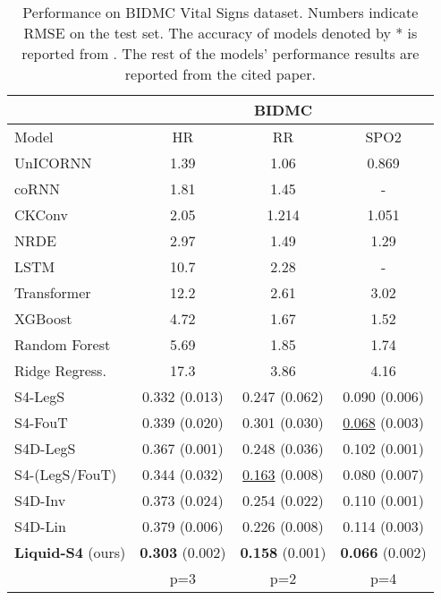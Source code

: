 \documentclass{MITcsail}
\begin{document}
\begin{table}[t]
    \centering
    \caption{Performance on BIDMC Vital Signs dataset. Numbers indicate RMSE on the test set. The accuracy of models denoted by * is reported from \citep{gu2022parameterization}. The rest of the models' performance results are reported from the cited paper.}
    \begin{adjustbox}{width=0.65\columnwidth}
    \begin{tabular}{lccc}
    \toprule
     & &  \textbf{BIDMC} & \\
     \toprule
        Model & HR & RR & SPO2 \\
        \midrule
UnICORNN \citep{rusch2021coupled} & 1.39 & 1.06 & 0.869 \\
coRNN \citep{rusch2021coupled} & 1.81 & 1.45 & - \\
CKConv & 2.05 & 1.214 & 1.051 \\
NRDE \citep{morrill2021neural} & 2.97 & 1.49 & 1.29 \\
LSTM & 10.7 & 2.28 & - \\
Transformer & 12.2 & 2.61 & 3.02 \\
XGBoost \citep{tan2021time} & 4.72 & 1.67 & 1.52 \\
Random Forest \citep{tan2021time} & 5.69 & 1.85 & 1.74 \\
Ridge Regress. \citep{tan2021time} &  17.3 & 3.86 & 4.16 \\
\midrule
        S4-LegS \citep{gu2022parameterization} & 0.332 (0.013) & 0.247 (0.062) & 0.090 (0.006) \\ 
        S4-FouT \citep{gu2022parameterization} & 0.339 (0.020) & 0.301 (0.030) & \underline {0.068} (0.003) \\ 
        S4D-LegS \citep{gu2022parameterization} & 0.367 (0.001) & 0.248 (0.036) & 0.102 (0.001) \\ 
        S4-(LegS/FouT) \citep{gu2022parameterization} & 0.344 (0.032) & \underline{0.163} (0.008) & 0.080 (0.007) \\
        S4D-Inv \citep{gu2022parameterization} & 0.373 (0.024) & 0.254 (0.022) & 0.110 (0.001) \\ 
        S4D-Lin \citep{gu2022parameterization} & 0.379 (0.006) & 0.226 (0.008) & 0.114 (0.003) \\ 
        \midrule
        \textbf{Liquid-S4} (ours) & \textbf{0.303} (0.002) & \textbf{0.158} (0.001) & \textbf{0.066} (0.002)\\
        & p=3 & p=2 & p=4 \\
        \bottomrule
    \end{tabular}
    \end{adjustbox}
    \label{tab:bidmc}
\end{table}
\end{document}
